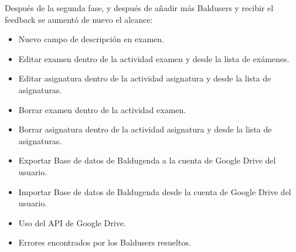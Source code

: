 Después de la segunda fase, y después de añadir más Baldusers y recibir el feedback se aumentó de nuevo el alcance:
\begin{itemize}
	\item Nuevo campo de descripción en examen.
	\item Editar examen dentro de la actividad examen y desde la lista de exámenes.
	\item Editar asignatura dentro de la actividad asignatura y desde la lista de asignaturas.
	\item Borrar examen dentro de la actividad examen.
	\item Borrar asignatura dentro de la actividad asignatura y desde la lista de asignaturas.
	\item Exportar Base de datos de Baldugenda a la cuenta de Google Drive del usuario.
	\item Importar Base de datos de Baldugenda desde la cuenta de Google Drive del usuario.
	\item Uso del API de Google Drive.
	\item Errores encontrados por los Baldusers resueltos.
\end{itemize}

